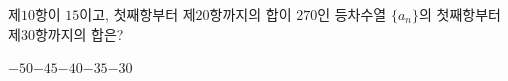 제$10$항이 $15$이고, 첫째항부터 제$20$항까지의 합이 $270$인 등차수열 $\{a_n\}$의 첫째항부터 제$30$항까지의 합은?
\begin{choices32}{$-50$}{$-45$}{$-40$}{$-35$}{$-30$}\end{choices32}
